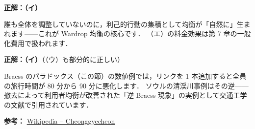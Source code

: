 \begin{example}[title={クイズ 4 正解・解説}]
\label{ans:q4}
\textbf{正解：（イ）}

誰も全体を調整していないのに，利己的行動の集積として均衡が「自然に」生まれます——これが Wardrop 均衡の核心です．
（エ）の料金効果は第 7 章の一般化費用で扱われます．
\end{example}

\begin{example}[title={クイズ 5 正解・解説}]
\label{ans:q5}
\textbf{正解：（イ）}（（ウ）も部分的に正しい）

Braess のパラドックス（この節）の数値例では，リンクを 1 本追加すると全員の旅行時間が 80 分から 90 分に悪化します．
ソウルの清渓川事例はその逆——撤去によって利用者均衡が改善された「逆 Braess 現象」の実例として交通工学の文献で引用されています．

\noindent\small\textbf{参考：}
\href{https://en.wikipedia.org/wiki/Cheonggyecheon}{Wikipedia -- Cheonggyecheon}
\end{example}
